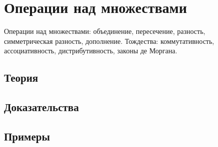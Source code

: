 
\section{Операции над множествами}
\label{sec:2.2.01-set-operations}

\begin{ticket}
Операции над множествами: объединение, пересечение, разность, симметрическая разность, дополнение. Тождества: коммутативность, ассоциативность, дистрибутивность, законы де Моргана.
\end{ticket}

\subsection*{Теория}

\subsection*{Доказательства}

\subsection*{Примеры}
